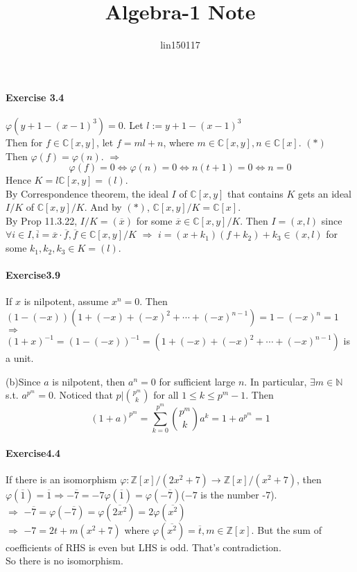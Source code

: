 \documentclass{article}
\title{Algebra-1 Note}
\author{lin150117 }
\date{}
\begin{document}
\setlength{\parindent}{0pt}
\paragraph{Exercise 3.4}


$ \varphi(y+1-(x-1)^3)=0 $. Let  $ l:=y+1-(x-1)^3 $ \\
Then for  $ f\in \mathbb{C}[x,y] $, let  $ f=ml+n $, where  $ m\in \mathbb{C}[x,y],n\in\mathbb{C}[x] $. $ (\ast ) $ \\
Then  $ \varphi(f)=\varphi(n) $. $ \Rightarrow $ 
\[\varphi(f)=0\Leftrightarrow \varphi(n)=0\Leftrightarrow n(t+1)=0\Leftrightarrow n=0\]    
Hence  $ K=l\mathbb{C}[x,y]=(l) $.\\
By Correspondence theorem, the ideal  $ I  $ of  $ \mathbb{C}[x,y] $ that contains  $ K  $  gets an ideal  $ I/K $ of  $ \mathbb{C}[x,y]/K $. And by  $ (\ast)  $,  $ \mathbb{C}[x,y]/K=\mathbb{C}[x] $.\\
By Prop 11.3.22,  $ I/K=(\overline{x}) $ for some  $ \overline{x}\in  \mathbb{C}[x,y]/K  $. Then  $ I=(x,l) $ since  $ \forall i\in I,\overline{i}=\overline{x}\cdot \overline{f},\overline{f}\in \mathbb{C }[x,y]/K $ $ \Rightarrow  $  $ i=(x+k_1)(f+k_2)+k_3\in (x,l) $ for some $ k_1,k_2,k_3\in K=(l) $.  

\paragraph{Exercise3.9}

If  $ x  $ is nilpotent, assume   $ x^n=0 $. Then  $ (1-(-x))(1+(-x)+(-x)^2+\cdots+(-x)^{n-1})=1-(-x)^n=1 $  $ \Rightarrow $  $ (1+x)^{-1}=(1-(-x))^{-1}=(1+(-x)+(-x)^2+\cdots+(-x)^{n-1}) $ is a unit.

(b)Since  $ a  $ is nilpotent, then  $ a^n=0  $ for sufficient large  $ n  $. In particular,  $ \exists m\in \mathbb{N} $ s.t.  $ a^{p^m }=0 $. Noticed that  $ p|\binom{p^m}{k}  $ for all  $ 1 \leq k \leq p^m-1 $. Then
\[(1+a)^{p^m}=\sum_{k=0}^{p^m}\binom{p^m}{k}a^k=1+a^{p^m}=1\] 


\paragraph{Exercise4.4}
If there is an isomorphism  $ \varphi:\mathbb{Z}[x]/(2x^2+7) \rightarrow \mathbb{Z}[x]/(x^2+7)$, then  $ \varphi(\overline{1})=\overline{1}\Rightarrow -\overline{7}=-7\varphi(\overline{1})=\varphi(-\overline{7}) $($ -7 $ is the number -7). \\
 $ \Rightarrow $  $ -\overline{7}=\varphi(-\overline{7})=\varphi(\overline{2x^2})=2\varphi(\overline{x^2}) $ \\
  $ \Rightarrow  $  $ -7=2t+m(x^2+7) $ where  $ \varphi(\overline{x^2})=\overline{t},m\in \mathbb{Z}[x] $. But the sum of coefficients of RHS is even but LHS is odd. That's contradiction.\\
  So there is no isomorphism.
\end{document}
